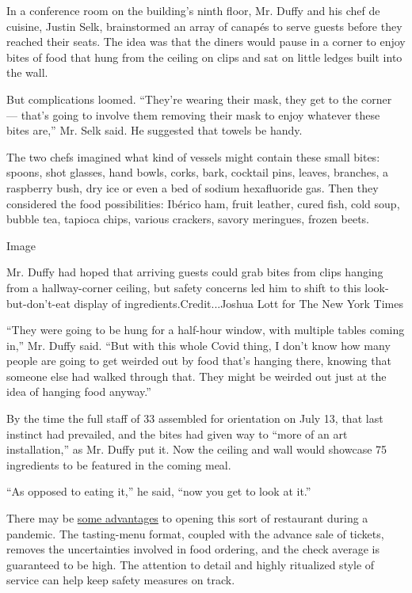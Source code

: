 In a conference room on the building's ninth floor, Mr. Duffy and his
chef de cuisine, Justin Selk, brainstormed an array of canapés to serve
guests before they reached their seats. The idea was that the diners
would pause in a corner to enjoy bites of food that hung from the
ceiling on clips and sat on little ledges built into the wall.

But complications loomed. ``They're wearing their mask, they get to the
corner --- that's going to involve them removing their mask to enjoy
whatever these bites are,'' Mr. Selk said. He suggested that towels be
handy.

The two chefs imagined what kind of vessels might contain these small
bites: spoons, shot glasses, hand bowls, corks, bark, cocktail pins,
leaves, branches, a raspberry bush, dry ice or even a bed of sodium
hexafluoride gas. Then they considered the food possibilities: Ibérico
ham, fruit leather, cured fish, cold soup, bubble tea, tapioca chips,
various crackers, savory meringues, frozen beets.

Image

Mr. Duffy had hoped that arriving guests could grab bites from clips
hanging from a hallway-corner ceiling, but safety concerns led him to
shift to this look-but-don't-eat display of ingredients.Credit...Joshua
Lott for The New York Times

``They were going to be hung for a half-hour window, with multiple
tables coming in,'' Mr. Duffy said. ``But with this whole Covid thing, I
don't know how many people are going to get weirded out by food that's
hanging there, knowing that someone else had walked through that. They
might be weirded out just at the idea of hanging food anyway.''

By the time the full staff of 33 assembled for orientation on July 13,
that last instinct had prevailed, and the bites had given way to ``more
of an art installation,'' as Mr. Duffy put it. Now the ceiling and wall
would showcase 75 ingredients to be featured in the coming meal.

``As opposed to eating it,'' he said, ``now you get to look at it.''

There may be
\href{https://www.nytimes.com/2020/07/28/dining/melbourne-restaurants-coronavirus.html}{some
advantages} to opening this sort of restaurant during a pandemic. The
tasting-menu format, coupled with the advance sale of tickets, removes
the uncertainties involved in food ordering, and the check average is
guaranteed to be high. The attention to detail and highly ritualized
style of service can help keep safety measures on track.

